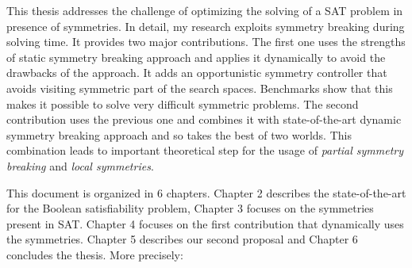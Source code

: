 %
%
%
This thesis addresses the challenge of optimizing the solving of a SAT problem in presence of
symmetries. In detail, my research exploits symmetry breaking during solving time.
It provides two major contributions. The first one uses the strengths of static symmetry 
breaking approach and applies it dynamically to avoid the drawbacks of the approach. 
It adds an opportunistic symmetry controller that avoids visiting symmetric part of the search spaces.
 Benchmarks show that this makes it possible to solve very difficult symmetric problems.
The second contribution uses the previous one and combines it with state-of-the-art dynamic 
symmetry breaking approach and so takes the best of two worlds. This combination leads to 
important theoretical step for the usage of \emph{partial symmetry breaking} and \emph{local symmetries}. 
 
This document is organized in 6 chapters. Chapter 2 describes the state-of-the-art
 for the Boolean satisfiability problem, Chapter 3 focuses on the symmetries present in SAT.
Chapter 4 focuses on the first contribution that dynamically uses the symmetries.
Chapter 5 describes our second proposal and Chapter 6 concludes the thesis. More precisely:
 
